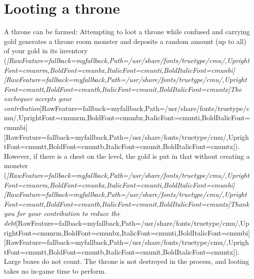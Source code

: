 \section{Looting a throne}
\label{5}
A throne can be farmed\footnotemark[98]: Attempting to loot\footnotemark[99] a throne while confused\footnotemark[100] and carrying gold generates a throne room monster\footnotemark[101] and deposits a random amount (up to all) of your gold\footnotemark[102] in its inventory ({\itshape \allowbreak{}\setmainfont{cmunti.ttf}[RawFeature={fallback=myfallback},Path=/usr/share/fonts/truetype/cmu/,UprightFont=cmunrm,BoldFont=cmunbx,ItalicFont=cmunti,BoldItalicFont=cmunbi]\setmonofont{cmunti.ttf}[RawFeature={fallback=myfallback},Path=/usr/share/fonts/truetype/cmu/,UprightFont=cmuntt,BoldFont=cmuntb,ItalicFont=cmunit,BoldItalicFont=cmuntx]\itshape {}The exchequer accepts your contribution}\allowbreak{}\setmainfont{cmunrm.ttf}[RawFeature={fallback=myfallback},Path=/usr/share/fonts/truetype/cmu/,UprightFont=cmunrm,BoldFont=cmunbx,ItalicFont=cmunti,BoldItalicFont=cmunbi]\setmonofont{cmunrm.ttf}[RawFeature={fallback=myfallback},Path=/usr/share/fonts/truetype/cmu/,UprightFont=cmuntt,BoldFont=cmuntb,ItalicFont=cmunit,BoldItalicFont=cmuntx]). However, if there is a chest\footnotemark[103] on the level, the gold is put in that without creating a monster ({\itshape \allowbreak{}\setmainfont{cmunti.ttf}[RawFeature={fallback=myfallback},Path=/usr/share/fonts/truetype/cmu/,UprightFont=cmunrm,BoldFont=cmunbx,ItalicFont=cmunti,BoldItalicFont=cmunbi]\setmonofont{cmunti.ttf}[RawFeature={fallback=myfallback},Path=/usr/share/fonts/truetype/cmu/,UprightFont=cmuntt,BoldFont=cmuntb,ItalicFont=cmunit,BoldItalicFont=cmuntx]\itshape {}Thank you for your contribution to reduce the debt}\allowbreak{}\setmainfont{cmunrm.ttf}[RawFeature={fallback=myfallback},Path=/usr/share/fonts/truetype/cmu/,UprightFont=cmunrm,BoldFont=cmunbx,ItalicFont=cmunti,BoldItalicFont=cmunbi]\setmonofont{cmunrm.ttf}[RawFeature={fallback=myfallback},Path=/usr/share/fonts/truetype/cmu/,UprightFont=cmuntt,BoldFont=cmuntb,ItalicFont=cmunit,BoldItalicFont=cmuntx]). Large boxes do not count. The throne is not destroyed in the process, and looting takes no in-{}game time to perform.


